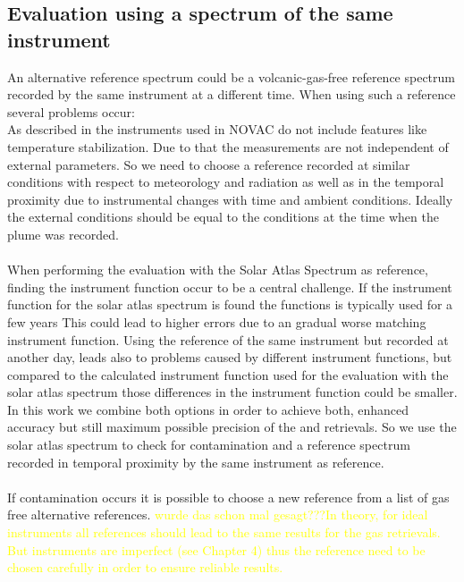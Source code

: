 %
\subsection*{Evaluation using a spectrum of the same instrument}
An alternative reference spectrum could be a volcanic-gas-free reference
spectrum recorded by the same instrument at a different time. When using such a reference several problems occur:\\
As described in  the instruments used in NOVAC do not include features like temperature stabilization. Due to that the measurements are not independent of external parameters. 
So we need to choose a reference recorded at similar conditions with respect to meteorology and	radiation as well as in the temporal proximity due to instrumental changes with time and ambient conditions. Ideally the external conditions should be equal to the conditions at the time when the plume was recorded.\\
\\
%
When performing the evaluation with the Solar Atlas Spectrum as reference, finding the instrument function occur to be a central challenge. If the instrument function for the solar atlas spectrum is found the functions is typically used for a few years This could lead to higher errors due to an gradual worse matching instrument function.
Using the reference of the same instrument but recorded at another day, leads also to problems caused by different instrument functions, but compared to the calculated instrument function used for the evaluation with the solar atlas spectrum those differences in the instrument function could be smaller.
\\
In this work we combine both options in order to
achieve both, enhanced accuracy but still maximum possible precision of
the  and  retrievals. So we use the solar atlas spectrum to check for 
contamination and a reference spectrum recorded in temporal proximity by the same instrument as reference.\\
\\
If contamination occurs it is possible to choose a new reference from a list of gas free alternative references. \textcolor{yellow}{wurde das schon mal gesagt???In theory, for ideal instruments all references should lead to
	the same results for the gas retrievals. But instruments are imperfect (see Chapter
	4) thus the reference need to be chosen carefully in order to ensure reliable results.}\\
%
\\
